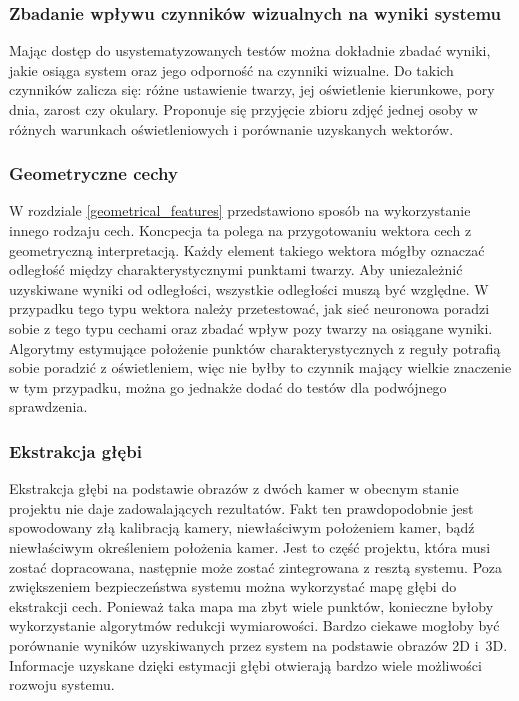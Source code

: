 \documentclass[oneside, eng]{mgr}
\begin{document}
\subsubsection{Zbadanie wpływu czynników wizualnych na wyniki systemu}
Mając dostęp do usystematyzowanych testów można dokładnie zbadać wyniki, jakie osiąga system oraz jego odporność na czynniki wizualne. Do takich czynników zalicza się: różne ustawienie twarzy, jej oświetlenie kierunkowe, pory dnia, zarost czy okulary. Proponuje się przyjęcie zbioru zdjęć jednej osoby w różnych warunkach oświetleniowych i porównanie uzyskanych wektorów.

\subsubsection{Geometryczne cechy}
W rozdziale \ref{geometrical_features} przedstawiono sposób na wykorzystanie innego rodzaju cech. Koncpecja ta polega na przygotowaniu wektora cech z geometryczną interpretacją. Każdy element takiego wektora mógłby oznaczać odległość między charakterystycznymi punktami twarzy. Aby uniezależnić uzyskiwane wyniki od odległości, wszystkie odległości muszą być względne. W przypadku tego typu wektora należy przetestować, jak sieć neuronowa poradzi sobie z tego typu cechami oraz zbadać wpływ pozy twarzy na osiągane wyniki. Algorytmy estymujące położenie punktów charakterystycznych z reguły potrafią sobie poradzić z oświetleniem, więc nie byłby to czynnik mający wielkie znaczenie w tym przypadku, można go jednakże dodać do testów dla podwójnego sprawdzenia.

\subsubsection{Ekstrakcja głębi}
Ekstrakcja głębi na podstawie obrazów z dwóch kamer w obecnym stanie projektu nie daje zadowalających rezultatów. Fakt ten prawdopodobnie jest spowodowany złą kalibracją kamery, niewłaściwym położeniem kamer, bądź niewłaściwym określeniem położenia kamer. Jest to część projektu, która musi zostać dopracowana, następnie może zostać zintegrowana z resztą systemu. Poza zwiększeniem bezpieczeństwa systemu można wykorzystać mapę głębi do ekstrakcji cech. Ponieważ taka mapa ma zbyt wiele punktów, konieczne byłoby wykorzystanie algorytmów redukcji wymiarowości. Bardzo ciekawe mogłoby być porównanie wyników uzyskiwanych przez system na podstawie obrazów 2D i~3D. Informacje uzyskane dzięki estymacji głębi otwierają bardzo wiele możliwości rozwoju systemu.
\end{document}
